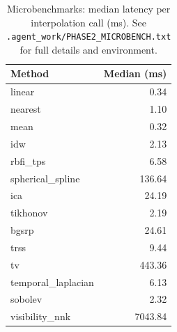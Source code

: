 \begin{table}[ht]
\centering
\small
\caption{Microbenchmarks: median latency per interpolation call (ms). See \texttt{.agent\_work/PHASE2\_MICROBENCH.txt} for full details and environment.}
\label{tab:phase2_microbench}
\begin{tabular}{l r}
\hline
Method & Median (ms) \\\hline
linear & 0.34 \\
nearest & 1.10 \\
mean & 0.32 \\
idw & 2.13 \\
rbfi\_tps & 6.58 \\
spherical\_spline & 136.64 \\
ica & 24.19 \\
tikhonov & 2.19 \\
bgsrp & 24.61 \\
trss & 9.44 \\
tv & 443.36 \\
temporal\_laplacian & 6.13 \\
sobolev & 2.32 \\
visibility\_nnk & 7043.84 \\\hline
\end{tabular}
\end{table}

